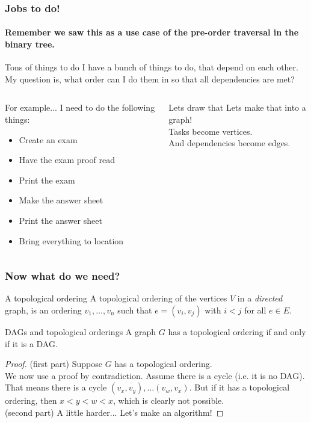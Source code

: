 \begin{frame}
	\frametitle{Jobs to do!}
	\framesubtitle{Remember we saw this as a use case of the pre-order traversal in the binary tree.}
	\begin{block}{Tons of things to do}
		I have a bunch of things to do, that depend on each other. My question is, what order can I do them in so that all
		dependencies are met?
	\end{block}
	\pause
	\begin{columns}
		\begin{block}{For example...}
			I need to do the following things:
			\begin{itemize}
				\item Create an exam
		\pause
				\item Have the exam proof read
				\item Print the exam
		\pause
				\item Make the answer sheet
				\item Print the answer sheet
		\pause
				\item Bring everything to location
			\end{itemize}
		\end{block}	
		\pause
			\begin{block}{Lets draw that}
				Lets make that into a graph!\\
				Tasks become vertices.\\
				And dependencies become edges.\\
			\end{block}	
	\end{columns}
\end{frame}

\begin{frame}
	\frametitle{Now what do we need?}
	
		\begin{block}{A topological ordering}
			A topological ordering of the vertices $V$ in a \textit{directed} graph, is an ordering $v_1, \dots, v_n$ such
			that $e=(v_i,v_j)$ with $i < j$ for all $e \in E$.
		\end{block}	

		\pause
		\begin{block}{DAGs and topological orderings}
			A graph $G$ has a topological ordering if and only if it is a DAG.
		\end{block}	
		\pause
		\begin{proof}
			(first part) Suppose $G$ has a topological ordering.\\
			\pause
			We now use a proof by contradiction. Assume there is a cycle (i.e. it is no DAG). That means there is a cycle
			$(v_x, v_y), \dots (v_w, v_x)$. But if it has a topological ordering, then $x < y < w < x$, which is clearly not
			possible.\\
			\pause
			(second part) A little harder... Let's make an algorithm!
		\end{proof}
\end{frame}

